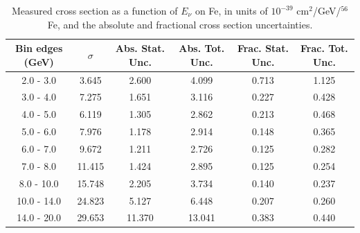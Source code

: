 \documentclass[aps,prl,twocolumn,superscriptaddress,nofootinbib]{revtex4-1}
\begin{document}
\begin{table}[h!]
  \centering
  \caption{Measured cross section as a function of $E_{\nu}$ on Fe, in units of
  $10^{-39}$ $\text{cm}^{2}$/GeV/$^{56}$Fe, and the absolute and
  fractional cross section uncertainties.}
    \begin{tabular}{c||c||c|c||c|c}
      Bin edges (GeV)  &  $\sigma$  &  Abs. Stat. Unc. & Abs. Tot. Unc.  &  Frac. Stat. Unc.  &  Frac. Tot. Unc. \\
      \hline\hline
        2.0 - 3.0 & 3.645 & 2.600 & 4.099 & 0.713 & 1.125 \\
        3.0 - 4.0 & 7.275 & 1.651 & 3.116 & 0.227 & 0.428 \\
        4.0 - 5.0 & 6.119 & 1.305 & 2.862 & 0.213 & 0.468 \\
        5.0 - 6.0 & 7.976 & 1.178 & 2.914 & 0.148 & 0.365 \\
        6.0 - 7.0 & 9.672 & 1.211 & 2.726 & 0.125 & 0.282 \\
        7.0 - 8.0 & 11.415 & 1.424 & 2.895 & 0.125 & 0.254 \\
       8.0 - 10.0 & 15.748 & 2.205 & 3.734 & 0.140 & 0.237 \\
      10.0 - 14.0 & 24.823 & 5.127 & 6.448 & 0.207 & 0.260 \\
      14.0 - 20.0 & 29.653 & 11.370 & 13.041 & 0.383 & 0.440 \\
    \end{tabular}
  \label{table:EnuXSec_Fe}
\end{table}
\end{document}
